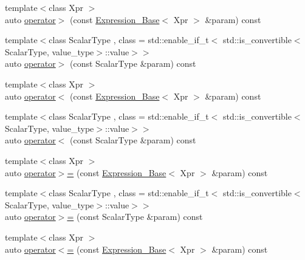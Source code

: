 \begin{DoxyCompactItemize}
\item 
{\footnotesize template$<$class Xpr $>$ }\\auto \hyperlink{classbc_1_1tensors_1_1Expression__Base_a0c12d27fd662e84850eb583d132c5b61}{operator$>$} (const \hyperlink{classbc_1_1tensors_1_1Expression__Base}{Expression\+\_\+\+Base}$<$ Xpr $>$ \&param) const
\item 
{\footnotesize template$<$class Scalar\+Type , class  = std\+::enable\+\_\+if\+\_\+t$<$   std\+::is\+\_\+convertible$<$\+Scalar\+Type, value\+\_\+type$>$\+::value$>$$>$ }\\auto \hyperlink{classbc_1_1tensors_1_1Expression__Base_ad4464ed8be86c2097b8aea7381a7ee51}{operator$>$} (const Scalar\+Type \&param) const
\item 
{\footnotesize template$<$class Xpr $>$ }\\auto \hyperlink{classbc_1_1tensors_1_1Expression__Base_ae95070c9fc89fdaf4cc7e8c8e70023b4}{operator$<$} (const \hyperlink{classbc_1_1tensors_1_1Expression__Base}{Expression\+\_\+\+Base}$<$ Xpr $>$ \&param) const
\item 
{\footnotesize template$<$class Scalar\+Type , class  = std\+::enable\+\_\+if\+\_\+t$<$   std\+::is\+\_\+convertible$<$\+Scalar\+Type, value\+\_\+type$>$\+::value$>$$>$ }\\auto \hyperlink{classbc_1_1tensors_1_1Expression__Base_aed7de0633c020ce8e663ac2bc97340d3}{operator$<$} (const Scalar\+Type \&param) const
\item 
{\footnotesize template$<$class Xpr $>$ }\\auto \hyperlink{classbc_1_1tensors_1_1Expression__Base_a1a503a1127bc1cbaa98e7310dd1475e9}{operator$>$=} (const \hyperlink{classbc_1_1tensors_1_1Expression__Base}{Expression\+\_\+\+Base}$<$ Xpr $>$ \&param) const
\item 
{\footnotesize template$<$class Scalar\+Type , class  = std\+::enable\+\_\+if\+\_\+t$<$   std\+::is\+\_\+convertible$<$\+Scalar\+Type, value\+\_\+type$>$\+::value$>$$>$ }\\auto \hyperlink{classbc_1_1tensors_1_1Expression__Base_a1959fe63f787e816c691c770675ba8c5}{operator$>$=} (const Scalar\+Type \&param) const
\item 
{\footnotesize template$<$class Xpr $>$ }\\auto \hyperlink{classbc_1_1tensors_1_1Expression__Base_a4bd234d71327653d4aa3b9fd7db21acd}{operator$<$=} (const \hyperlink{classbc_1_1tensors_1_1Expression__Base}{Expression\+\_\+\+Base}$<$ Xpr $>$ \&param) const
\item 

\end{DoxyCompactItemize}
